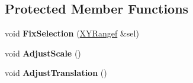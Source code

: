 \subsection*{Protected Member Functions}
\begin{DoxyCompactItemize}
\item 
void {\bfseries Fix\+Selection} (\hyperlink{structpangolin_1_1_x_y_range}{X\+Y\+Rangef} \&sel)\hypertarget{classpangolin_1_1_image_view_handler_af2cd9ec553f526094d4fe10f618e1a60}{}\label{classpangolin_1_1_image_view_handler_af2cd9ec553f526094d4fe10f618e1a60}

\item 
void {\bfseries Adjust\+Scale} ()\hypertarget{classpangolin_1_1_image_view_handler_a5e402d7a2de14056babc7d5d6d161e29}{}\label{classpangolin_1_1_image_view_handler_a5e402d7a2de14056babc7d5d6d161e29}

\item 
void {\bfseries Adjust\+Translation} ()\hypertarget{classpangolin_1_1_image_view_handler_af3447c2f5e7615b414f6d0edf50017f7}{}\label{classpangolin_1_1_image_view_handler_af3447c2f5e7615b414f6d0edf50017f7}

\end{DoxyCompactItemize}
